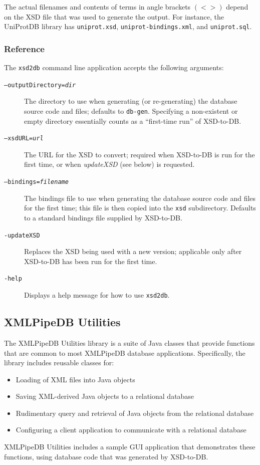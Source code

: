 \documentclass[11pt]{article}
\begin{document}
The actual filenames and contents of terms in angle brackets $(< >)$ depend on the XSD file that was used to generate the output.  For instance, the UniProtDB library has \texttt{uniprot.xsd}, \texttt{uniprot-bindings.xml}, and \texttt{uniprot.sql}.

\subsubsection{Reference}

The \texttt{xsd2db} command line application accepts the following arguments:
\begin{description}
\item[\texttt{--outputDirectory=\emph{dir}}] The directory to use when generating (or re-generating) the database source code and files; defaults to \texttt{db-gen}.  Specifying a non-existent or empty directory essentially counts as a ``first-time run'' of XSD-to-DB.

\item[\texttt{--xsdURL=\emph{url}}] The URL for the XSD to convert; required when XSD-to-DB is run for the first time, or when \emph{updateXSD} (see below) is requested.

\item[\texttt{--bindings=\emph{filename}}] The bindings file to use when generating the database source code and files for the first time; this file is then copied into the \texttt{xsd} subdirectory.  Defaults to a standard bindings file supplied by XSD-to-DB.

\item[\texttt{-updateXSD}] Replaces the XSD being used with a new version; applicable only after XSD-to-DB has been run for the first time.

\item[\texttt{-help}] Displays a help message for how to use \texttt{xsd2db}.
\end{description}

\subsection{XMLPipeDB Utilities}
\label{xmlpipedbutils}

The XMLPipeDB Utilities library is a suite of Java classes that provide functions that are common to most XMLPipeDB database applications.  Specifically, the library includes reusable classes for:
\begin{itemize}
\item Loading of XML files into Java objects
\item Saving XML-derived Java objects to a relational database
\item Rudimentary query and retrieval of Java objects from the relational database
\item Configuring a client application to communicate with a relational database
\end{itemize}
XMLPipeDB Utilities includes a sample GUI application that demonstrates these functions, using database code that was generated by XSD-to-DB.
\end{document}
